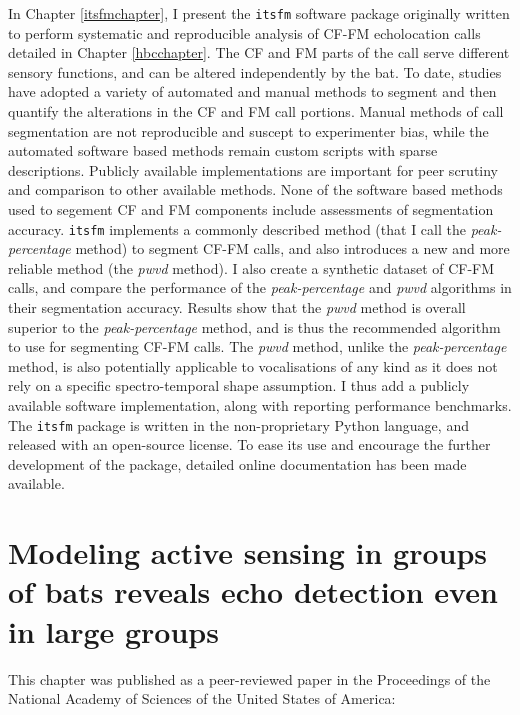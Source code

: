 \documentclass[
]{book}
\begin{document}
In Chapter \ref{itsfmchapter}, I present the \texttt{itsfm} software package originally written to perform systematic and reproducible analysis of CF-FM echolocation calls detailed in Chapter \ref{hbcchapter}. The CF and FM parts of the call serve different sensory functions, and can be altered independently by the bat. To date, studies have adopted a variety of automated and manual methods to segment and then quantify the alterations in the CF and FM call portions. Manual methods of call segmentation are not reproducible and suscept to experimenter bias, while the automated software based methods remain custom scripts with sparse descriptions. Publicly available implementations are important for peer scrutiny and comparison to other available methods. None of the software based methods used to segement CF and FM components include assessments of segmentation accuracy. \texttt{itsfm} implements a commonly described method (that I call the \emph{peak-percentage} method) to segment CF-FM calls, and also introduces a new and more reliable method (the \emph{pwvd} method). I also create a synthetic dataset of CF-FM calls, and compare the performance of the \emph{peak-percentage} and \emph{pwvd} algorithms in their segmentation accuracy. Results show that the \emph{pwvd} method is overall superior to the \emph{peak-percentage} method, and is thus the recommended algorithm to use for segmenting CF-FM calls. The \emph{pwvd} method, unlike the \emph{peak-percentage} method, is also potentially applicable to vocalisations of any kind as it does not rely on a specific spectro-temporal shape assumption. I thus add a publicly available software implementation, along with reporting performance benchmarks. The \texttt{itsfm} package is written in the non-proprietary Python language, and released with an open-source license. To ease its use and encourage the further development of the package, detailed online documentation has been made available.

\hypertarget{cpnchapter}{%
\chapter{Modeling active sensing in groups of bats reveals echo detection even in large groups}\label{cpnchapter}}


This chapter was published as a peer-reviewed paper in the Proceedings of the National Academy of Sciences of the United States of America:
\end{document}
